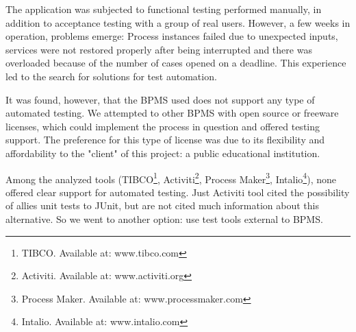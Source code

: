 \documentclass[runningheads,a4paper]{llncs}
\begin{document}
The application was subjected to functional testing performed manually, in addition to acceptance testing with a group of real users. However, a few weeks in operation, problems emerge: Process instances failed due to unexpected inputs, services were not restored properly after being interrupted and there was overloaded because of the number of cases opened on a deadline. This experience led to the search for solutions for test automation.

It was found, however, that the BPMS used does not support any type of automated testing. We attempted to other BPMS with open source or freeware licenses, which could implement the process in question and offered testing support. The preference for this type of license was due to its flexibility and affordability to the "client" of this project: a public educational institution.

Among the analyzed tools (TIBCO\footnote{TIBCO. Available at: www.tibco.com}, Activiti\footnote{Activiti. Available at: www.activiti.org}, Process Maker\footnote{Process Maker. Available at: www.processmaker.com}, Intalio\footnote{Intalio. Available at: www.intalio.com}), none offered clear support for automated testing. Just Activiti tool cited the possibility of allies unit tests to JUnit, but are not cited much information about this alternative. So we went to another option: use test tools external to BPMS.
\end{document}
